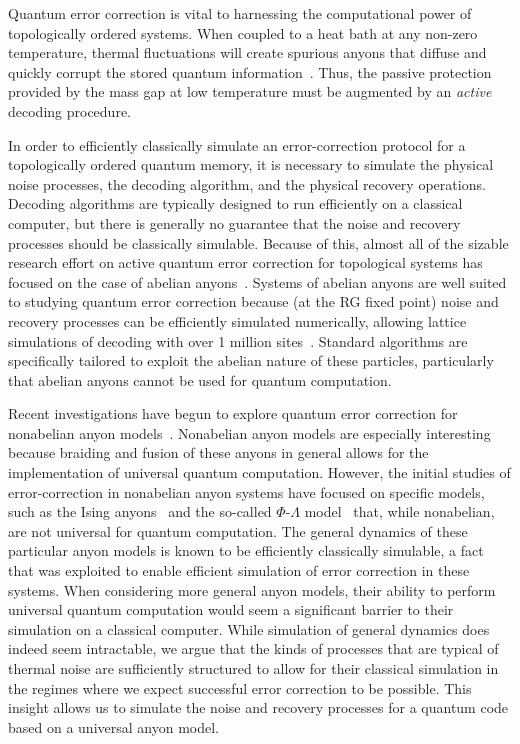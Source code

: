 \documentclass[aps, prl, letterpaper, twocolumn, superscriptaddress, notitlepage, 10pt]{revtex4-1}
\begin{document}
Quantum error correction is vital to harnessing the computational power of topologically 
ordered systems. When coupled to a heat bath at any non-zero temperature, thermal fluctuations 
will create spurious anyons that diffuse and quickly corrupt the stored quantum 
information~\cite{Pastawski2010}. Thus, the passive protection provided by the mass gap 
at low temperature must be augmented by an \emph{active} decoding procedure. 

In order to efficiently classically simulate an error-correction protocol for 
a topologically ordered quantum memory, it is necessary to simulate 
the physical noise processes, the decoding algorithm, and the physical recovery operations. 
Decoding algorithms are typically designed to run efficiently on a 
classical computer, but there is generally no guarantee that the 
noise and recovery processes should be classically simulable.
Because of this, almost all of the sizable research effort 
on active quantum error correction for topological systems has focused 
on the case of abelian anyons~\cite{Dennis2002, Duclos-Cianci2010, Duclos-Cianci2010a, Wang2010, Wang2010a, Duclos-Cianci2013, Bravyi2011, Bombin2012, Wootton2012, Anwar2014, Watson2014, Hutter2014a, Bravyi2014, Wootton2015, Fowler2015, Andrist2015}.
Systems of abelian anyons are well suited to studying quantum 
error correction because (at the RG fixed point) noise and 
recovery processes can be efficiently simulated numerically, allowing lattice simulations 
of decoding with over 1 million sites~\cite{Duclos-Cianci2010}. 
Standard algorithms are specifically tailored to exploit the abelian nature 
of these particles, particularly that abelian anyons cannot be used for quantum computation. 

Recent investigations have begun to explore quantum error correction for nonabelian anyon 
models~\cite{Brell2013, Wootton2013, Hutter2014, Wootton2015b, Hutter2015continuous}. Nonabelian anyon models are especially interesting 
because braiding and fusion of these anyons in general allows for the implementation of universal quantum 
computation. However, the initial studies of error-correction in nonabelian anyon systems have focused on specific models, such as the Ising 
anyons~\cite{Brell2013, Hutter2015continuous} and the so-called $\Phi$-$\Lambda$ 
model~\cite{Wootton2013, Hutter2014} that, while nonabelian, are not universal for quantum computation. The general dynamics of these particular anyon models is known to be efficiently classically simulable, a fact
that was exploited to enable efficient simulation of error correction 
in these systems. When considering more general anyon models, their 
ability to perform universal quantum computation would seem a significant 
barrier to their simulation on a classical computer. While simulation 
of general dynamics does indeed seem intractable, we argue that 
the kinds of processes that are typical of thermal noise 
are sufficiently structured  to allow for their classical simulation 
in the regimes where we expect successful error correction to 
be possible. This insight allows us to simulate the noise 
and recovery processes for a quantum code based on a universal anyon model.
\end{document}
